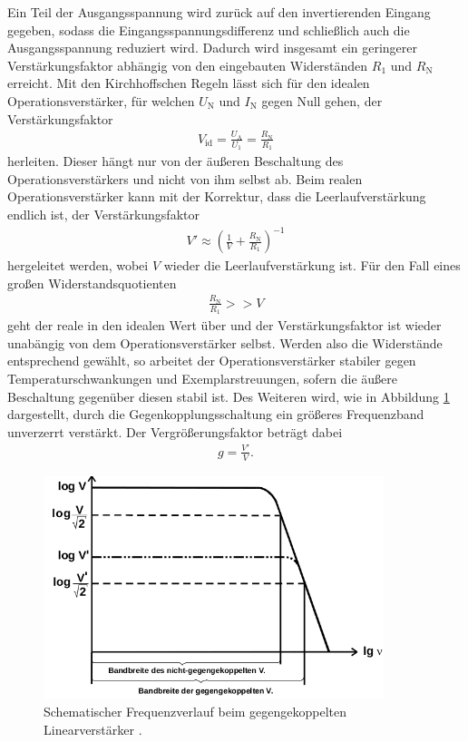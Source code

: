 Ein Teil der Ausgangsspannung wird zurück auf den invertierenden Eingang gegeben, sodass die Eingangsspannungsdifferenz
und schließlich auch die Ausgangsspannung reduziert wird. Dadurch wird insgesamt ein geringerer Verstärkungsfaktor abhängig von
den eingebauten Widerständen $R_1$ und $R_\text{N}$ erreicht. Mit den Kirchhoffschen Regeln lässt sich für den idealen
Operationsverstärker, für welchen $U_\text{N}$ und $I_\text{N}$ gegen Null gehen, der Verstärkungsfaktor
\begin{align}
  V_\text{id} = \frac{U_\text{A}}{U_\text{1}} = \frac{R_\text{N}}{R_1}
\end{align}
herleiten. Dieser hängt nur von der äußeren Beschaltung des Operationsverstärkers und nicht von ihm selbst ab.
Beim realen Operationsverstärker kann mit der Korrektur, dass die Leerlaufverstärkung endlich ist, der
Verstärkungsfaktor
\begin{align}
  V' \approx \left( \frac1{V} + \frac{R_\text{N}}{R_1} \right)^{-1}
  \label{eqn:leerlaufverst}
\end{align}
hergeleitet werden, wobei $V$ wieder die Leerlaufverstärkung ist. Für den Fall eines großen Widerstandsquotienten
\begin{align}
  \frac{R_\text{N}}{R_1} >> V
\end{align}
geht der reale in den idealen Wert über und der Verstärkungsfaktor ist wieder unabängig von dem Operationsverstärker selbst.
Werden also die Widerstände entsprechend gewählt, so arbeitet der Operationsverstärker stabiler gegen Temperaturschwankungen
und Exemplarstreuungen, sofern die äußere Beschaltung gegenüber diesen stabil ist.
Des Weiteren wird, wie in Abbildung \ref{fig:frequenzband} dargestellt, durch die Gegenkopplungsschaltung ein größeres Frequenzband unverzerrt verstärkt.
Der Vergrößerungsfaktor beträgt dabei
\begin{align}
  g = \frac{V'}{V}.
\end{align}

\begin{figure}
  \centering
  \includegraphics[height=6.5cm]{ImmerDieseNorweger/frequenzband.png}
  \caption{Schematischer Frequenzverlauf beim gegengekoppelten Linearverstärker \cite{anleitung}.}
  \label{fig:frequenzband}
\end{figure}

